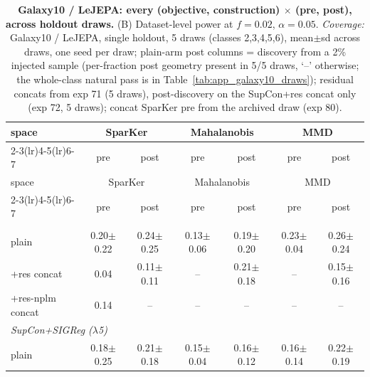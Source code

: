 \begin{center}
\small
\begin{longtable}{lcccccc}
\caption{\textbf{Galaxy10 / LeJEPA: every (objective, construction) $\times$ (pre, post), across holdout draws.} (B) Dataset-level power at $f=0.02$, $\alpha=0.05$. \emph{Coverage:} Galaxy10 / LeJEPA, single holdout, 5 draws (classes 2,3,4,5,6), mean$\pm$sd across draws, one seed per draw; plain-arm post columns = discovery from a 2\% injected sample (per-fraction post geometry present in 5/5 draws, `--' otherwise; the whole-class natural pass is in Table~\ref{tab:app_galaxy10_draws}); residual concats from exp 71 (5 draws), post-discovery on the SupCon+res concat only (exp 72, 5 draws); concat SparKer pre from the archived draw (exp 80).}\label{tab:grid_galaxy10_lejepa_b}\\
\toprule
space & \multicolumn{2}{c}{SparKer} & \multicolumn{2}{c}{Mahalanobis} & \multicolumn{2}{c}{MMD} \\
\cmidrule(lr){2-3}\cmidrule(lr){4-5}\cmidrule(lr){6-7}
& pre & post & pre & post & pre & post \\
\midrule
\endfirsthead
\toprule
space & \multicolumn{2}{c}{SparKer} & \multicolumn{2}{c}{Mahalanobis} & \multicolumn{2}{c}{MMD} \\
\cmidrule(lr){2-3}\cmidrule(lr){4-5}\cmidrule(lr){6-7}
& pre & post & pre & post & pre & post \\
\midrule
\endhead
\bottomrule
\endfoot
\multicolumn{7}{l}{\emph{SupCon}} \\
\quad plain & 0.20$\pm$0.22 & 0.24$\pm$0.25 & 0.13$\pm$0.06 & 0.19$\pm$0.20 & 0.23$\pm$0.04 & 0.26$\pm$0.24 \\
\quad +res concat & 0.04 & 0.11$\pm$0.11 & -- & 0.21$\pm$0.18 & -- & 0.15$\pm$0.16 \\
\quad +res-nplm concat & 0.14 & -- & -- & -- & -- & -- \\
\multicolumn{7}{l}{\emph{SupCon+SIGReg ($\lambda$5)}} \\
\quad plain & 0.18$\pm$0.25 & 0.21$\pm$0.18 & 0.15$\pm$0.04 & 0.16$\pm$0.12 & 0.16$\pm$0.14 & 0.22$\pm$0.19 \\

\end{longtable}
\end{center}
